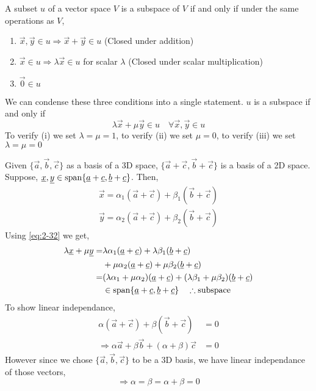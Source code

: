 \documentclass{article}
\numberwithin{equation}{section}
\begin{document}
\begin{thm}
    A subset $u$ of a vector space $V$ is a subspace of $V$ if and only if under the same operations as $V$,
    \begin{enumerate}
        \item $\vec{x}, \vec{y} \in u \Rightarrow \vec{x} + \vec{y} \in u$ \hspace*{\fill}(Closed under addition)
        \item $\vec{x} \in u \Rightarrow \lambda\vec{x}\in u$ for scalar $\lambda$ \hspace*{\fill}(Closed under scalar multiplication)
        \item $\vec{0} \in u$
    \end{enumerate}
    We can condense these three conditions into a single statement. $u$ is a subspace if and only if
    \begin{equation}\label{eq:2-32}
        \lambda \vec{x} + \mu \vec{y} \in u \quad \forall \vec{x}, \vec{y} \in u  
    \end{equation}
    To verify (i) we set $\lambda = \mu = 1$, to verify (ii) we set $\mu = 0$, to verify (iii) we set $\lambda = \mu = 0$
\end{thm}

\begin{eg}
    Given $\{\vec{a}, \vec{b}, \vec{c}\}$ as a basis of a 3D space, $\{\vec{a} + \vec{c}, \vec{b} + \vec{c}\}$ is a basis of a 2D space.
    Suppose, $\underline{x}, \underline{y} \in \operatorname{span}\{\underline{a} + \underline{c}, \underline{b} + \underline{c}\}$. Then,
    \begin{align*}
        \vec{x} = \alpha_1 (\vec{a} + \vec{c}) + \beta_1 (\vec{b} + \vec{c}) \\
        \vec{y} = \alpha_2 (\vec{a} + \vec{c}) + \beta_2 (\vec{b} + \vec{c})
    \end{align*}
    Using \eqref{eq:2-32} we get,
    \begin{align*}
        \lambda\underline{x} + \mu \underline{y} =& \lambda\alpha_1 (\underline{a} + \underline{c}) + \lambda\beta_1 (\underline{b} + \underline{c}) \\
        &+ \mu\alpha_2 (\underline{a} + \underline{c}) + \mu\beta_2 (\underline{b} + \underline{c}) \\
        =& (\lambda\alpha_1 + \mu\alpha_2)(\underline{a} + \underline{c}) + (\lambda\beta_1 + \mu\beta_2)(\underline{b} + \underline{c}) \\
        & \in \operatorname{span}\{\underline{a} + \underline{c}, \underline{b} + \underline{c}\} \quad \therefore \text{subspace}
    \end{align*}
    To show linear independance,
    \begin{align*}
        \alpha (\vec{a} + \vec{c}) + \beta (\vec{b} + \vec{c}) &= 0 \\
        \Rightarrow \alpha\vec{a} + \beta \vec{b} + (\alpha + \beta)\vec{c} &= 0
    \end{align*}
    However since we chose $\{\vec{a}, \vec{b}, \vec{c} \}$ to be a 3D basis, we have linear independance of those vectors,
    \[
        \Rightarrow \alpha = \beta = \alpha + \beta = 0  
    \]
\end{eg}

\end{document}
